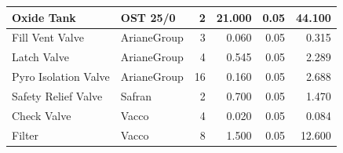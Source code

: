 \documentclass[conference]{IEEEtran}
\begin{document}
\begin{table}
{\begin{tabular}{|l|l|r|r|r|r|}
\hline
Oxide Tank                                                   & OST 25/0                                          & 2                    & 21.000                                                                                            & 0.05                 & 44.100                                                                                          \\ 
\hline
Fill  Vent Valve                                             & ArianeGroup                                       & 3                    & 0.060                                                                                             & 0.05                 & 0.315                                                                                           \\ 
\hline
Latch Valve                                                  & ArianeGroup                                       & 4                    & 0.545                                                                                             & 0.05                 & 2.289                                                                                           \\ 
\hline
Pyro Isolation Valve                                         & ArianeGroup                                       & 16                   & 0.160                                                                                             & 0.05                 & 2.688                                                                                           \\ 
\hline
Safety Relief Valve                                          & Safran                                            & 2                    & 0.700                                                                                             & 0.05                 & 1.470                                                                                           \\ 
\hline
Check Valve                                                  & {\cellcolor[rgb]{1,0.831,0.541}}Vacco             & 4                    & 0.020                                                                                             & 0.05                 & 0.084                                                                                           \\ 
\hline
Filter                                                       & {\cellcolor[rgb]{1,0.831,0.541}}Vacco             & 8                    & 1.500                                                                                             & 0.05                 & 12.600                                                                                          \\ 

\end{tabular}}
\end{table}
\end{document}
